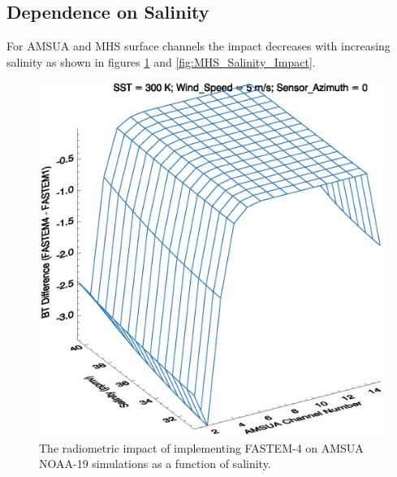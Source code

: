\newpage

\subsection{Dependence on Salinity}
For AMSUA and MHS surface channels the impact decreases with increasing salinity as shown in figures \ref{fig:AMSUA_Salinity_Impact} and \ref{fig:MHS_Salinity_Impact}.  

\begin{figure}[htp]
  \centering
  \includegraphics[scale=0.75]{graphics/AMSUA_Salinity_BT.eps}
  \caption{The radiometric impact of implementing FASTEM-4 on AMSUA NOAA-19 simulations as a function of salinity.}
  \label{fig:AMSUA_Salinity_Impact}
\end{figure}

